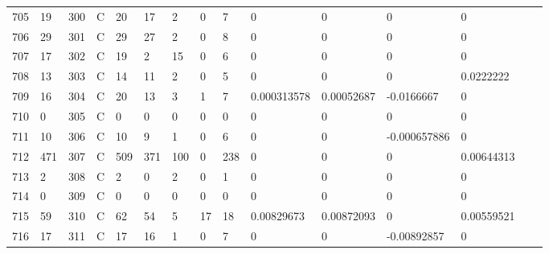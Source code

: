 \begin{longtable}{lllllllllllllll}
	705 & 19                & 300 & C   & 20                & 17                & 2                 & 0    & 7          & 0              & 0              & 0             & 0            \\
	706 & 29                & 301 & C   & 29                & 27                & 2                 & 0    & 8          & 0              & 0              & 0             & 0            \\
	707 & 17                & 302 & C   & 19                & 2                 & 15                & 0    & 6          & 0              & 0              & 0             & 0            \\
	708 & 13                & 303 & C   & 14                & 11                & 2                 & 0    & 5          & 0              & 0              & 0             & 0.0222222    \\
	709 & 16                & 304 & C   & 20                & 13                & 3                 & 1    & 7          & 0.000313578    & 0.00052687     & -0.0166667    & 0            \\
	710 & 0                 & 305 & C   & 0                 & 0                 & 0                 & 0    & 0          & 0              & 0              & 0             & 0            \\
	711 & 10                & 306 & C   & 10                & 9                 & 1                 & 0    & 6          & 0              & 0              & -0.000657886  & 0            \\
	712 & 471               & 307 & C   & 509               & 371               & 100               & 0    & 238        & 0              & 0              & 0             & 0.00644313   \\
	713 & 2                 & 308 & C   & 2                 & 0                 & 2                 & 0    & 1          & 0              & 0              & 0             & 0            \\
	714 & 0                 & 309 & C   & 0                 & 0                 & 0                 & 0    & 0          & 0              & 0              & 0             & 0            \\
	715 & 59                & 310 & C   & 62                & 54                & 5                 & 17   & 18         & 0.00829673     & 0.00872093     & 0             & 0.00559521   \\
	716 & 17                & 311 & C   & 17                & 16                & 1                 & 0    & 7          & 0              & 0              & -0.00892857   & 0            \\

\end{longtable}
